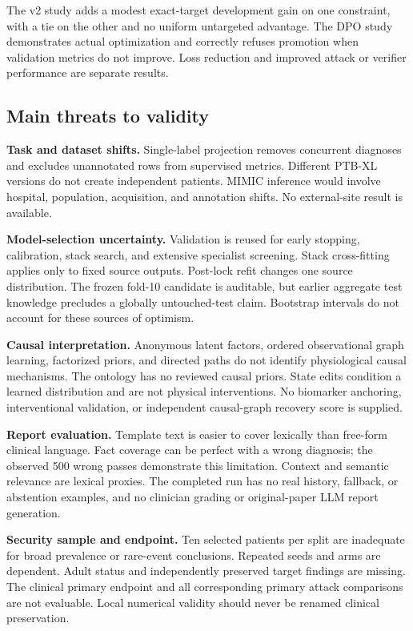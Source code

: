 The v2 study adds a modest exact-target development gain on one constraint, with a tie on the other and no uniform untargeted advantage. The DPO study demonstrates actual optimization and correctly refuses promotion when validation metrics do not improve. Loss reduction and improved attack or verifier performance are separate results.\par

\subsection{Main threats to validity}
\textbf{Task and dataset shifts.} Single-label projection removes concurrent diagnoses and excludes unannotated rows from supervised metrics. Different PTB-XL versions do not create independent patients. MIMIC inference would involve hospital, population, acquisition, and annotation shifts. No external-site result is available.

\textbf{Model-selection uncertainty.} Validation is reused for early stopping, calibration, stack search, and extensive specialist screening. Stack cross-fitting applies only to fixed source outputs. Post-lock refit changes one source distribution. The frozen fold-10 candidate is auditable, but earlier aggregate test knowledge precludes a globally untouched-test claim. Bootstrap intervals do not account for these sources of optimism.

\textbf{Causal interpretation.} Anonymous latent factors, ordered observational graph learning, factorized priors, and directed paths do not identify physiological causal mechanisms. The ontology has no reviewed causal priors. State edits condition a learned distribution and are not physical interventions. No biomarker anchoring, interventional validation, or independent causal-graph recovery score is supplied.

\textbf{Report evaluation.} Template text is easier to cover lexically than free-form clinical language. Fact coverage can be perfect with a wrong diagnosis; the observed 500 wrong passes demonstrate this limitation. Context and semantic relevance are lexical proxies. The completed run has no real history, fallback, or abstention examples, and no clinician grading or original-paper LLM report generation.

\textbf{Security sample and endpoint.} Ten selected patients per split are inadequate for broad prevalence or rare-event conclusions. Repeated seeds and arms are dependent. Adult status and independently preserved target findings are missing. The clinical primary endpoint and all corresponding primary attack comparisons are not evaluable. Local numerical validity should never be renamed clinical preservation.

